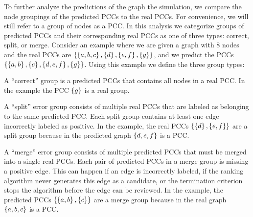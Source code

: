     To further analyze the predictions of the graph the simulation, we compare the node groupings of the
      predicted PCCs to the real \groundtruth{} PCCs.
    For convenience, we will still refer to a group of nodes as a PCC.
    In this analysis we categorize groups of predicted PCCs and their corresponding real PCCs as one of three
      types:
    correct, split, or merge.
    Consider an example where we are given a graph with $8$ nodes and the real PCCs are %
    $\left\{\left\{a, b, c\right\}, \left\{d\right\}, \left\{e, f\right\}, \left\{g\right\}\right\}$, and we predict the PCCs%
    $\left\{\left\{a, b\right\}, \left\{c\right\}, \left\{d, e, f\right\}, \left\{g\right\}\right\}$.
    Using this example we define the three group types:
    \begin{enumln}
        \item A ``correct'' group is a predicted PCCs that contains all nodes in a real PCC.
        In the example the PCC $\left\{g\right\}$ is a real group.
        
        \item A ``split'' error group consists of multiple real PCCs that are labeled as belonging to the same
          predicted PCC.
        Each split group contains at least one edge incorrectly labeled as positive.
        In the example, the real PCCs $\left\{\left\{d\right\}, \left\{e, f\right\}\right\}$ are a split group because in the
          predicted graph $\left\{d, e, f\right\}$ is a PCC.
      
        \item A ``merge'' error group consists of multiple predicted PCCs that must be merged into a single real
          PCCs.
        Each pair of predicted PCCs in a merge group is missing a positive edge.
        This can happen if an edge is incorrectly labeled, if the ranking algorithm never generates this edge as
          a candidate, or the termination criterion stops the algorithm before the edge can be reviewed.
        In the example, the predicted PCCs $\left\{\left\{a, b\right\}, \left\{c\right\}\right\}$ are a merge group because in the
          real graph $\left\{a, b, c\right\}$ is a PCC.
        
    \end{enumln}
